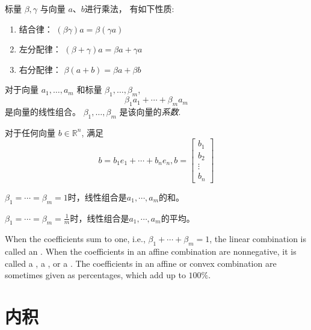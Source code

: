 \begin{theorem}
    标量 $  \beta, \gamma  $ 与向量 $  a 、 b  $进行乘法， 有如下性质:
    \begin{enumerate}
        \item 结合律： $  (\beta \gamma) a=\beta(\gamma a)  $
        \item 左分配律： $  (\beta+\gamma) a=\beta a+\gamma a  $
        \item 右分配律： $  \beta(a+b)=\beta a+\beta b  $
    \end{enumerate}
\end{theorem}

\begin{definition}[线性组合]
    对于向量 $  a_{1}, \ldots, a_{m}  $ 和标量 $  \beta_{1}, \ldots, \beta_{m}  $,
    \begin{equation} \beta_{1} a_{1}+\cdots+\beta_{m} a_{m} \end{equation}
    是向量的线性组合。 $  \beta_{1}, \ldots, \beta_{m}  $ 是该向量的\textit{系数}. 
\end{definition}



    \begin{theorem}
        对于任何向量 $  b \in \mathbb{R}^{n}  $, 满足
    \begin{equation} b=b_{1} e_{1}+\cdots+b_{n} e_{n}, b=\left[\begin{array}{c}b_{1} \\ b_{2} \\ \vdots \\ b_{n}\end{array}\right] \end{equation}
    \end{theorem}
    
    $ \beta_{1}=\cdots=\beta_{m}=1 $时，线性组合是$a_1, \cdots, a_m$的和。

    $ \beta_{1}=\cdots=\beta_{m} = \frac{1}{m} $时，线性组合是$a_1, \cdots, a_m$的平均。

    When the coefficients sum to one, i.e., $ \beta_{1}+\cdots+\beta_{m}=1 $, the linear combination is called an . When the coefficients in an affine combination are nonnegative, it is called a , a , or a . The coefficients in an affine or convex combination are sometimes given as percentages, which add up to $ 100 \% $.

\section{内积}

